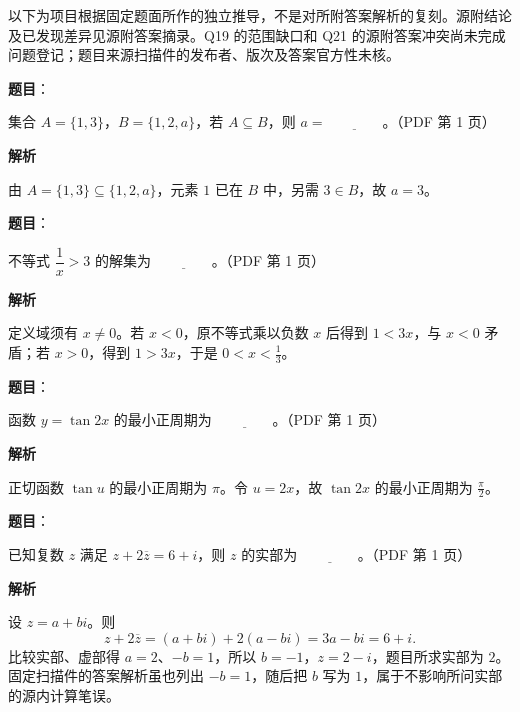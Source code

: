 

\begin{gktip}
以下为项目根据固定题面所作的独立推导，不是对所附答案解析的复刻。源附结论及已发现差异见源附答案摘录。Q19 的范围缺口和 Q21 的源附答案冲突尚未完成问题登记；题目来源扫描件的发布者、版次及答案官方性未核。
\end{gktip}

\begin{answer}

\textbf{题目}：

集合 $A=\{1,3\}$，$B=\{1,2,a\}$，若 $A\subseteq B$，则 $a=\underline{\qquad\qquad}$。（PDF 第 1 页）

\textbf{解析}

由 $A=\{1,3\}\subseteq\{1,2,a\}$，元素 $1$ 已在 $B$ 中，另需 $3\in B$，故 $a=3$。


\end{answer}
\begin{answer}

\textbf{题目}：

不等式 $\dfrac1x>3$ 的解集为 $\underline{\qquad\qquad}$。（PDF 第 1 页）

\textbf{解析}

定义域须有 $x\ne0$。若 $x<0$，原不等式乘以负数 $x$ 后得到 $1<3x$，与 $x<0$ 矛盾；若 $x>0$，得到 $1>3x$，于是 $0<x<\frac13$。


\end{answer}
\begin{answer}

\textbf{题目}：

函数 $y=\tan 2x$ 的最小正周期为 $\underline{\qquad\qquad}$。（PDF 第 1 页）

\textbf{解析}

正切函数 $\tan u$ 的最小正周期为 $\pi$。令 $u=2x$，故 $\tan2x$ 的最小正周期为 $\frac\pi2$。


\end{answer}
\begin{answer}

\textbf{题目}：

已知复数 $z$ 满足 $z+2\overline z=6+i$，则 $z$ 的实部为 $\underline{\qquad\qquad}$。（PDF 第 1 页）

\textbf{解析}

设 $z=a+bi$。则
\nopagebreak[4]
\[
z+2\overline z=(a+bi)+2(a-bi)=3a-bi=6+i.
\]
比较实部、虚部得 $a=2$、$-b=1$，所以 $b=-1$，$z=2-i$，题目所求实部为 $2$。固定扫描件的答案解析虽也列出 $-b=1$，随后把 $b$ 写为 $1$，属于不影响所问实部的源内计算笔误。


\end{answer}
